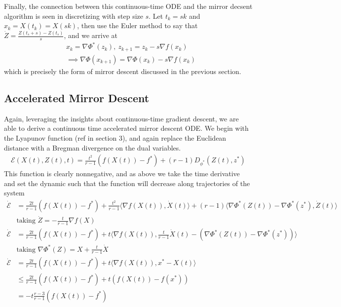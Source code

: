 Finally, the connection between this continuous-time ODE and the mirror decsent algorithm is seen in discretizing with step size $s$. Let $t_k = sk$ and $x_k = X(t_k) = X(sk)$, then use the Euler method to say that $\dot Z = \frac{Z(t_s + s) - Z(t_s)}{s}$, and we arrive at
\begin{align*}
&x_k = \nabla \Phi^*(z_k),~z_{k+1} = z_k - s \nabla f(x_k)\\
&\implies \nabla \Phi(x_{k+1}) = \nabla \Phi(x_k) - s \nabla f(x_k)
\end{align*}
which is precisely the form of mirror descent discussed in the previous section.

\subsection{Accelerated Mirror Descent}
Again, leveraging the insights about continuous-time gradient descent, we are able to derive a continuous time accelerated mirror descent ODE. We begin with the Lyapunov function (ref in section 3), and again replace the Euclidean distance with a Bregman divergence on the dual variables. 
\begin{align*} 
\mathcal{E}(X(t),Z(t),t) = \frac{t^2}{r-1} (f(X(t)) - f^*) + (r-1) D_{\phi^*} (Z(t), z^*) \end{align*}
This function is clearly nonnegative, and as above we take the time derivative and set the dynamic such that the function will decrease along trajectories of the system
\begin{align*} 
\dot {\mathcal{E}} &= \frac{2t}{r-1} (f(X(t)) - f^*) + \frac{t^2}{r-1} \langle \nabla f(X(t)), \dot X(t)\rangle + (r-1) \langle \nabla \Phi^* (Z(t)) -  \nabla \Phi^* (z^*), \dot{Z}(t) \rangle\\
&\text{taking }\dot Z = -\frac{t}{r-1} \nabla f(X)\\
\dot {\mathcal{E}} &= \frac{2t}{r-1} (f(X(t)) - f^*) + t \langle \nabla f(X(t)), \frac{t}{r-1} \dot X(t) - (\nabla \Phi^* (Z(t)) -  \nabla \Phi^* (z^*)) \rangle\\
&\text{taking } \nabla \Phi^* (Z) = X + \frac{t}{r-1}\dot X\\
\dot {\mathcal{E}} &= \frac{2t}{r-1} (f(X(t)) - f^*) + t \langle \nabla f(X(t)), x^* - X(t)   \rangle\\
&\leq \frac{2t}{r-1} (f(X(t)) - f^*) + t ( f(X(t))- f(x^*))\\
&= -t \frac{r-3}{r-1} (f(X(t)) - f^*)
\end{align*} 

